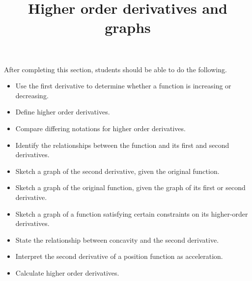 \documentclass{ximera}
\title{Higher order derivatives and graphs}
\begin{document}
\begin{abstract}
\end{abstract}

\maketitle

\begin{sectionOutcomes}

After completing this section, students should be able to do the following.


\begin{itemize}
\item Use the first derivative to determine whether a function is increasing or decreasing.
\item Define higher order derivatives.
\item Compare differing notations for higher order derivatives.
\item Identify the relationships between the function and its first and second derivatives.
\item Sketch a graph of the second derivative, given the original function.
\item Sketch a graph of the original function, given the graph of its first or second derivative.
\item Sketch a graph of a function satisfying certain constraints on its higher-order derivatives.
\item State the relationship between concavity and the second derivative.
\item Interpret the second derivative of a position function as acceleration.
\item Calculate higher order derivatives.

\end{itemize}
\end{sectionOutcomes}
\end{document}

